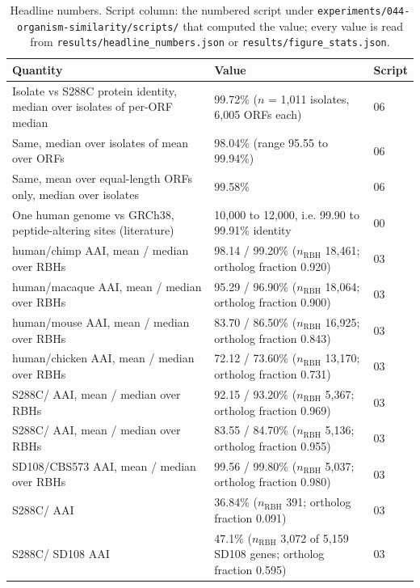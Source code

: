 \begin{table}[H]\centering\footnotesize
\caption[]{Headline numbers. Script column: the numbered script under \texttt{experiments/044-organism-similarity/scripts/} that computed the value; every value is read from \texttt{results/headline\_numbers.json} or \texttt{results/figure\_stats.json}.}
\label{tab:headline}
\begin{tabular}{@{}L{78mm} L{82mm} l@{}}
\toprule
Quantity & Value & Script \\
\midrule
Isolate vs S288C protein identity, median over isolates of per-ORF median & 99.72\% ($n$ = 1,011 isolates, 6,005 ORFs each) & 06 \\
Same, median over isolates of mean over ORFs & 98.04\% (range 95.55 to 99.94\%) & 06 \\
Same, mean over equal-length ORFs only, median over isolates & 99.58\% & 06 \\
One human genome vs GRCh38, peptide-altering sites (literature) & 10,000 to 12,000, i.e. 99.90 to 99.91\% identity & 00 \\
human/chimp AAI, mean / median over RBHs & 98.14 / 99.20\% ($n_\mathrm{RBH}$ 18,461; ortholog fraction 0.920) & 03 \\
human/macaque AAI, mean / median over RBHs & 95.29 / 96.90\% ($n_\mathrm{RBH}$ 18,064; ortholog fraction 0.900) & 03 \\
human/mouse AAI, mean / median over RBHs & 83.70 / 86.50\% ($n_\mathrm{RBH}$ 16,925; ortholog fraction 0.843) & 03 \\
human/chicken AAI, mean / median over RBHs & 72.12 / 73.60\% ($n_\mathrm{RBH}$ 13,170; ortholog fraction 0.731) & 03 \\
S288C/ AAI, mean / median over RBHs & 92.15 / 93.20\% ($n_\mathrm{RBH}$ 5,367; ortholog fraction 0.969) & 03 \\
S288C/ AAI, mean / median over RBHs & 83.55 / 84.70\% ($n_\mathrm{RBH}$ 5,136; ortholog fraction 0.955) & 03 \\
SD108/CBS573 AAI, mean / median over RBHs & 99.56 / 99.80\% ($n_\mathrm{RBH}$ 5,037; ortholog fraction 0.980) & 03 \\
S288C/ AAI & 36.84\% ($n_\mathrm{RBH}$ 391; ortholog fraction 0.091) & 03 \\
S288C/ SD108 AAI & 47.1\% ($n_\mathrm{RBH}$ 3,072 of 5,159 SD108 genes; ortholog fraction 0.595) & 03 \\

\end{tabular}
\end{table}
